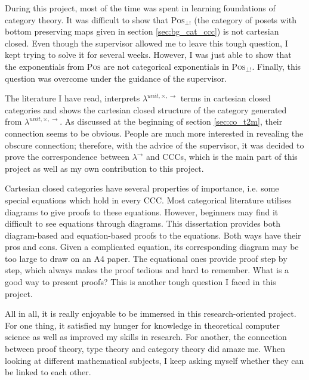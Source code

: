 During this project, most of the time was spent in learning foundations of category theory. It was difficult to show that \textsc{Pos}$_{\bot !}$ (the category of posets with bottom preserving maps given in section \ref{sec:bg_cat_ccc}) is not cartesian closed. Even though the supervisor allowed me to leave this tough question, I kept trying to solve it for several weeks. However, I was just able to show that the exponentials from \textsc{Pos} are not categorical exponentials in \textsc{Pos}$_{\bot !}$. Finally, this question was overcome under the guidance of the supervisor.

The literature \cite{AL91,BW95,LS86,Mit96} I have read, interprets $ \lambda^{unit,\times,\to} $ terms in cartesian closed categories and shows the cartesian closed structure of the category generated from $ \lambda^{unit,\times,\to} $. As discussed at the beginning of section \ref{sec:co_t2m}, their connection seems to be obvious. People are much more interested in revealing the obscure connection; therefore, with the advice of the supervisor, it was decided to prove the correspondence between $ \lambda^{\to} $ and CCCs, which is the main part of this project as well as my own contribution to this project.

Cartesian closed categories have several properties of importance, i.e. some special equations which hold in every CCC. Most categorical literature utilises diagrams to give proofs to these equations. However, beginners may find it difficult to see equations through diagrams. This dissertation provides both diagram-based and equation-based proofs to the equations. Both ways have their pros and cons. Given a complicated equation, its corresponding diagram may be too large to draw on an A4 paper. The equational ones provide proof step by step, which always makes the proof tedious and hard to remember. What is a good way to present proofs? This is another tough question I faced in this project.

All in all, it is really enjoyable to be immersed in this research-oriented project. For one thing, it satisfied my hunger for knowledge in theoretical computer science as well as improved my skills in research. For another, the connection between proof theory, type theory and category theory did amaze me. When looking at different mathematical subjects, I keep asking myself whether they can be linked to each other.